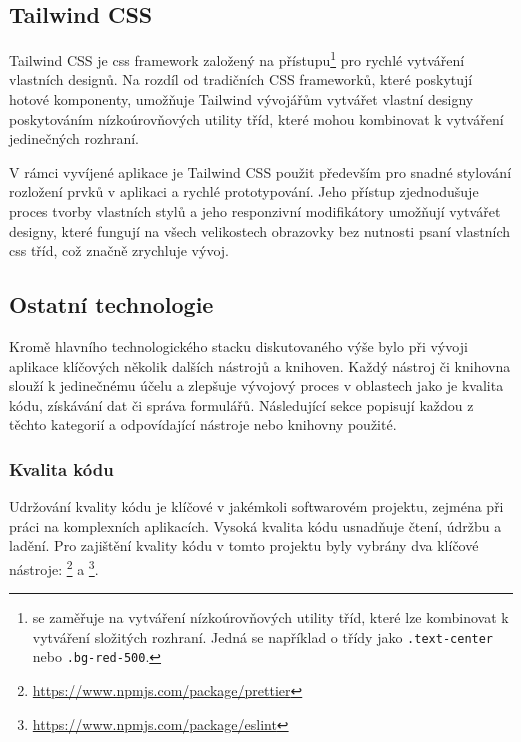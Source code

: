 \subsection{Tailwind CSS}
\label{subsec:implementace-technologie-tailwind}
Tailwind CSS je \ac{css} framework založený na  přístupu\footnote{ se zaměřuje na vytváření nízkoúrovňových utility tříd, které lze kombinovat k vytváření složitých rozhraní.
Jedná se například o třídy jako \texttt{.text-center} nebo \texttt{.bg-red-500}.} pro rychlé vytváření vlastních designů.
Na rozdíl od tradičních CSS frameworků, které poskytují hotové komponenty, umožňuje Tailwind vývojářům vytvářet vlastní designy poskytováním nízkoúrovňových utility tříd, které mohou kombinovat k vytváření jedinečných rozhraní\cite{tc__tailwindcss_com}.

V rámci vyvíjené aplikace je Tailwind CSS použit především pro snadné stylování rozložení prvků v aplikaci a rychlé prototypování.
Jeho  přístup zjednodušuje proces tvorby vlastních stylů a jeho responzivní modifikátory umožňují vytvářet designy, které fungují na všech velikostech obrazovky bez nutnosti psaní vlastních \ac{css} tříd\cite{tc__tailwindcss_com}, což značně zrychluje vývoj.

\subsection{Ostatní technologie}
\label{subsec:implementace-technologie-ostatni}
Kromě hlavního technologického stacku diskutovaného výše bylo při vývoji aplikace klíčových několik dalších nástrojů a knihoven.
Každý nástroj či knihovna slouží k jedinečnému účelu a zlepšuje vývojový proces v oblastech jako je kvalita kódu, získávání dat či správa formulářů.
Následující sekce popisují každou z těchto kategorií a odpovídající nástroje nebo knihovny použité.

\subsubsection{Kvalita kódu}
\label{subsubsec:implementace-technologie-ostatni-kvalita}
Udržování kvality kódu je klíčové v jakémkoli softwarovém projektu, zejména při práci na komplexních aplikacích.
Vysoká kvalita kódu usnadňuje čtení, údržbu a ladění.
Pro zajištění kvality kódu v tomto projektu byly vybrány dva klíčové nástroje: \footnote{\url{https://www.npmjs.com/package/prettier}} a \footnote{\url{https://www.npmjs.com/package/eslint}}.

